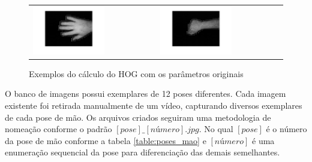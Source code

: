 \begin{figure}[H]
	\centering
	\begin{tabular}{p{} p{}}
		\vspace{1pt} \includegraphics[width=0.6\textwidth]{image/hog/0_01.png} &
		\vspace{0pt} \includegraphics[width=0.6\textwidth]{image/hog/7_01.png}
	\end{tabular}	
  	\caption{Exemplos do cálculo do HOG com os parâmetros originais}
  	\label{fig:hog_example1}
\end{figure}

O banco de imagens possui exemplares de 12 poses diferentes. Cada imagem existente foi retirada manualmente de um vídeo, capturando diversos exemplares de cada pose de mão. Os arquivos criados seguiram uma metodologia de nomeação conforme o padrão \([pose]\_[número].jpg\). No qual \([pose]\) é o número da pose de mão conforme a tabela \ref{table:poses_mao} e \([número]\) é uma enumeração sequencial da pose para diferenciação das demais semelhantes.

\newcommand{\addpose}[2] {
	\arabic{table:counter_poses_mao} \stepcounter{table:counter_poses_mao} & 
	#1 & 
	\texttt{[image: \#2]}
}


